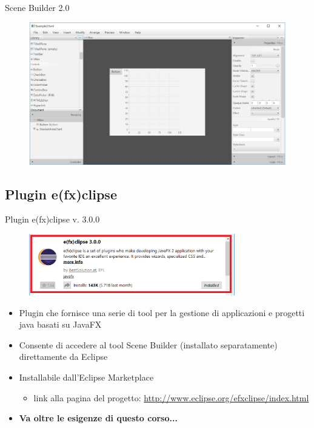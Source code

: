 \documentclass[presentation]{beamer}
\begin{document}
\begin{frame}{Scene Builder 2.0}
\begin{figure}
\includegraphics[width=\textwidth]{img/scenebuilder.png}
\end{figure}
\end{frame}

\subsection{Plugin e(fx)clipse}

\begin{frame}{Plugin e(fx)clipse v. 3.0.0}
\begin{figure}
\includegraphics[width=0.8\textwidth]{img/plugin-install.png}
\end{figure}
\begin{itemize}\itemsep5pt
\item Plugin che fornisce una serie di tool per la gestione di applicazioni e progetti java basati su JavaFX
\item Consente di accedere al tool Scene Builder (installato separatamente) direttamente da Eclipse
\item Installabile dall'Eclipse Marketplace
\begin{itemize}
\item link alla pagina del progetto: \url{http://www.eclipse.org/efxclipse/index.html}
\end{itemize}
\item \textbf{Va oltre le esigenze di questo corso...}
\end{itemize}
\end{frame}



%
\end{document}
